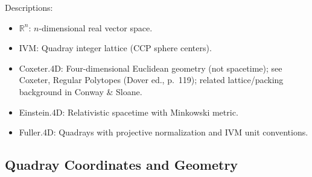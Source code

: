 \documentclass[
  10pt,
]{article}
\providecommand{\tightlist}{%
  \setlength{\itemsep}{0pt}\setlength{\parskip}{0pt}}
\begin{document}
Descriptions:

\begin{itemize}
\tightlist
\item
  \(\mathbb{R}^n\): \(n\)-dimensional real vector space.
\item
  IVM: Quadray integer lattice (CCP sphere centers).
\item
  Coxeter.4D: Four-dimensional Euclidean geometry (not spacetime); see
  Coxeter, Regular Polytopes (Dover ed., p.~119); related
  lattice/packing background in Conway \& Sloane.
\item
  Einstein.4D: Relativistic spacetime with Minkowski metric.
\item
  Fuller.4D: Quadrays with projective normalization and IVM unit
  conventions.
\end{itemize}

\subsection{Quadray Coordinates and
Geometry}\label{quadray-coordinates-and-geometry}
\end{document}
